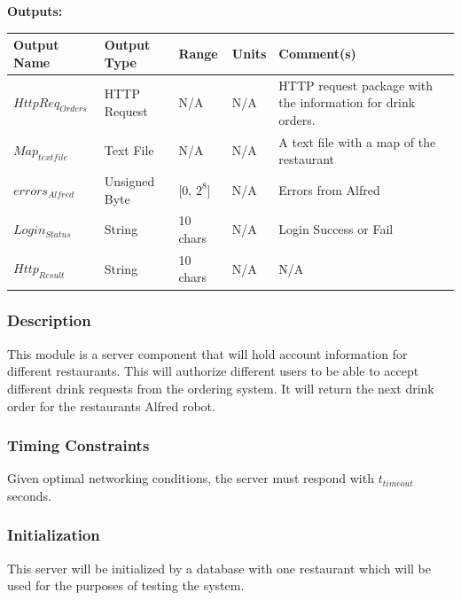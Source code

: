 \documentclass [10pt]{article}
\begin{document}
\textbf{Outputs: } \\

\begin{longtable}{| p{} | p{} | p{} | p{} | p{} |}\hline 
	\rowcolor{tableCell}\textbf{Output Name} & \textbf{Output Type} & \textbf{Range} & \textbf{Units} & \textbf{Comment(s)} \\ \hline
	$ HttpReq_{Orders} $ & HTTP Request & N/A & N/A & HTTP request package with the information for drink orders. \\ \hline
	\rowcolor{tableCell}$ Map_{textfile} $ & Text File & N/A & N/A & A text file with a map of the restaurant \\ \hline
	$  errors_{Alfred} $ & Unsigned Byte & [0, $2^{8}$]& N/A & Errors from Alfred \\ \hline
	\rowcolor{tableCell}$  Login_{Status} $ & String & 10 chars & N/A & Login Success or Fail \\ \hline
	$  Http_{Result} $ & String & 10 chars & N/A & N/A\\ \hline
\end{longtable}


\subsubsection{Description}
This module is a server component that will hold account information for different restaurants. This will  authorize different users to be able to accept different drink requests from the ordering system. It will return the next drink order for the restaurants Alfred robot.


\subsubsection{Timing Constraints}
Given optimal networking conditions, the server must respond with  $ t_{timeout} $ seconds.


\subsubsection{Initialization}
This server will be initialized by a database with one restaurant which will be used for the purposes of testing the system.
\end{document}
